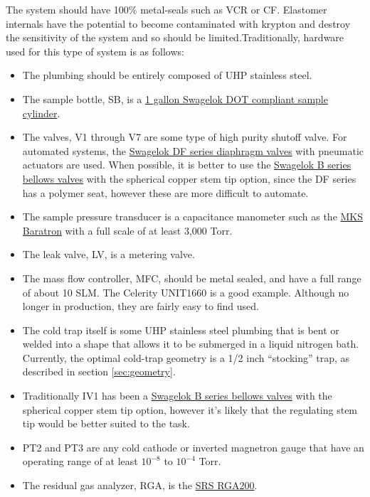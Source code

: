 \documentclass[12pt]{article}
\begin{document}
The system should have 100\% metal-seals such as VCR or CF. Elastomer internals have the potential to become contaminated with krypton and destroy the sensitivity of the system and so should be limited.Traditionally, hardware used for this type of system is as follows:
\begin{itemize}
\item The plumbing should be entirely composed of UHP stainless steel.
\item The sample bottle, SB, is a \href{https://www.swagelok.com/en/product/Sample-Cylinders/DOT-Compliant}{1 gallon Swagelok DOT compliant sample cylinder}. 
\item The valves, V1 through V7 are some type of high purity shutoff valve. For automated systems, the \href{https://www.swagelok.com/en/product/Valves/Diaphragm-Sealed-Valves}{Swagelok DF series diaphragm valves} with pneumatic actuators are used. When possible, it is better to use the \href{https://www.swagelok.com/en/product/Valves/Bellows-Sealed}{Swagelok B series bellows valves} with the spherical copper stem tip option, since the DF series has a polymer seat, however these are more difficult to automate.
\item The sample pressure transducer is a capacitance manometer such as the \href{https://www.mksinst.com/product/category.aspx?CategoryID=72}{MKS Baratron} with a full scale of at least 3,000 Torr.
\item The leak valve, LV, is a metering valve.
\item The mass flow controller, MFC, should be metal sealed, and have a full range of about 10 SLM. The Celerity UNIT1660 is a good example. Although no longer in production, they are fairly easy to find used.
\item The cold trap itself is some UHP stainless steel plumbing that is bent or welded into a shape that allows it to be submerged in a liquid nitrogen bath. Currently, the optimal cold-trap geometry is a 1/2 inch ``stocking'' trap, as described in section \ref{sec:geometry}.
\item Traditionally IV1 has been a \href{https://www.swagelok.com/en/product/Valves/Bellows-Sealed}{Swagelok B series bellows valves} with the spherical copper stem tip option, however it's likely that the regulating stem tip would be better suited to the task. 
\item PT2 and PT3 are any cold cathode or inverted magnetron gauge that have an operating range of at least $10^{-8}$ to $10^{-4}$ Torr.
\item The residual gas analyzer, RGA, is the \href{http://www.thinksrs.com/products/RGA.htm}{SRS RGA200}.

\end{itemize}
\end{document}
